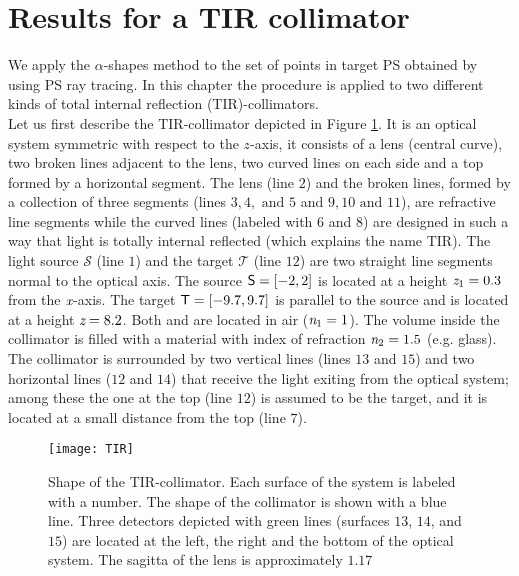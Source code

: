 \section{Results for a TIR collimator}\label{results-Tir-alpha}
We apply the $\alpha$-shapes method to the set of points in target PS obtained by using PS ray tracing.
In this chapter the procedure is applied to two different kinds of total internal reflection (TIR)-collimators.\\ \indent  
Let us first describe the TIR-collimator depicted in Figure \ref{fig:tir}. It is an optical system symmetric with respect to the $z$-axis, it consists of a lens (central curve), two broken lines adjacent to the lens,
two curved lines on each side and a top formed by a horizontal segment. The lens (line $2$) and the broken lines, formed by a collection of three segments (lines $3, 4, \mbox{ and } 5$ and $9, 10 \mbox{ and } 11$), are refractive line segments while the curved lines (labeled with $6$ and $8$) are designed in such a way that light is totally internal reflected (which explains the name TIR).
The light source $\mathcal{S}$ (line $1$) and the target $\mathcal{T}$ (line $12$) are two straight line segments normal to the optical axis.
The source $\textsf{S}= [-2,2]$ is located at a height $\textit{z}_{1} = 0.3$ from the $\textit{x}$-axis.
 The target $\textsf{T}= [-9.7, 9.7]$ is parallel to the source and is located at a height $ \textit{z}= 8.2$. Both  and  are located in air ($\textit{n}_1=1$).
The volume inside the collimator is filled with a material with index of refraction $\textit{n}_2=1.5$ (e.g. glass).
The collimator is surrounded by two vertical lines (lines $13$ and $15$) and two horizontal lines ($12$ and $14$) that receive the light exiting from the optical system; among these the one at the top (line $12$) is assumed to be the target, and it is located at a small distance from the top (line $7$). 
\begin{figure}[h]
  \begin{center}
  \texttt{[image: TIR]}
  \end{center}
  \caption{Shape of the TIR-collimator. Each surface of the system is labeled with a number.
   The shape of the collimator is shown with a blue line.
   Three detectors depicted with green lines (surfaces $13$, $14$, and $15$) are located at the left, the right and the bottom of the optical system.
The sagitta of the lens is approximately $1.17$}
  \label{fig:tir}
\end{figure}
\\ \indent
